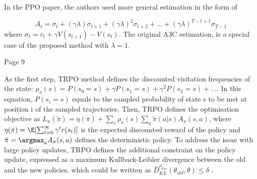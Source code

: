 In the PPO paper, the authors used more general estimation in the form of

\begin{equation*}
  A_t= \sigma_t+(\gamma\lambda)\sigma_{t+1}+(\gamma\lambda)^2\sigma_{t+2}+\ldots+(\gamma\lambda)^{T-t+1}\sigma_{T-1}
\end{equation*}
where \begin{math}\sigma_t=r_t+\gamma V(s_{t+1})-V(s_t)\end{math}. The original
A3C estimation, is a special case of the proposed method with \begin{math}\lambda=1\end{math}.

Page 9

As the first step, TRPO method defines the discounted visitation frequencies of
the state: \begin{math}\rho_\pi(s)=P(s_0=s)+\gamma P(s_1=s)+\gamma^2 P(s_2=s)+\ldots\end{math}.
In this equation, \begin{math}P(s_i=s)\end{math} equals to the sampled
probability of state s to be met at position i of the sampled trajectories.
Then, TRPO defines the optimisation objective as
\begin{math}L_\pi(\tilde{\pi})=\eta(\pi) +
  \sum_s\rho_\pi(s)\sum_a\tilde{\pi}(a|s)A_\pi(s, a)\end{math},
where \begin{math}\eta(\pi)=\E[\sum_{t=0}^{\infty}\gamma^t r(s_t)]\end{math} is
the expected discounted reward of the policy and
\begin{math}\tilde{\pi}=\argmax_aA_\pi(s, a)\end{math} defines the deterministic policy.
To address the issue with large policy updates, TRPO defines the additional
constraint on the policy update, expressed as a maximum Kullback-Leibler
divergence between the old and the new policies, which could be written as
\begin{math}\bar{D}_{KL}^{\rho_{\theta_{old}}}(\theta_{old},\theta) \leq \delta\end{math}
.


  

